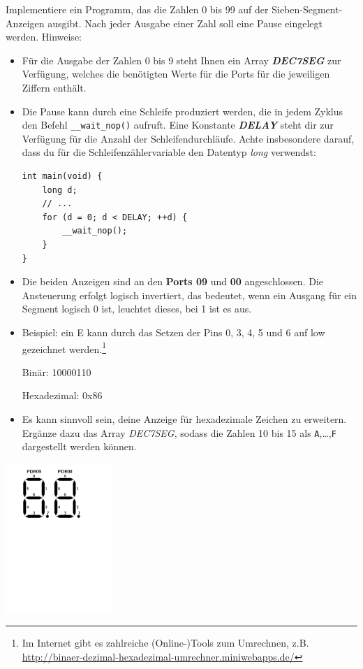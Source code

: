 Implementiere ein Programm, das die Zahlen 0 bis 99 auf der Sieben-Segment-Anzeigen ausgibt.
Nach jeder Ausgabe einer Zahl soll eine Pause eingelegt werden.
Hinweise:\begin{itemize}
\item 
Für die Ausgabe der Zahlen 0 bis 9 steht Ihnen ein Array \textbf{\emph{DEC7SEG}} zur Verfügung, welches die benötigten Werte für die Ports für die jeweiligen Ziffern enthält.

\item 
Die Pause kann durch eine Schleife produziert werden, die in jedem Zyklus den Befehl \texttt{\_\_wait\_nop()} aufruft.
Eine Konstante \textbf{\emph{DELAY}} steht dir zur Verfügung für die Anzahl der Schleifendurchläufe.
Achte insbesondere darauf, dass du für die Schleifenzählervariable den Datentyp \emph{long} verwendst:
\begin{lstlisting}
int main(void) {
    long d;
    // ...
    for (d = 0; d < DELAY; ++d) {
        __wait_nop();
    }
}
\end{lstlisting}

\item
Die beiden Anzeigen sind an den \textbf{Ports 09} und \textbf{00} angeschlossen.
Die Ansteuerung erfolgt logisch invertiert, das bedeutet, wenn ein Ausgang für ein Segment logisch 0 ist, leuchtet dieses, bei 1 ist es aus.

\item
Beispiel: ein \glqq{}E\grqq{} kann durch das Setzen der Pins 0, 3, 4, 5 und 6 auf low gezeichnet werden.\footnote{
	Im Internet gibt es zahlreiche (Online-)Tools zum Umrechnen, z.B. 
	\url{http://binaer-dezimal-hexadezimal-umrechner.miniwebapps.de/}
}

\quad Binär: 10000110

\quad Hexadezimal: 0x86

\item
Es kann sinnvoll sein, deine Anzeige für hexadezimale Zeichen zu erweitern.
Ergänze dazu das Array \emph{DEC7SEG}, sodass die Zahlen 10 bis 15 als \texttt{A},\dots,\texttt{F} dargestellt werden können.

\end{itemize}
\begin{center}\includegraphics[width=0.3\textwidth]{7seg}\end{center}

